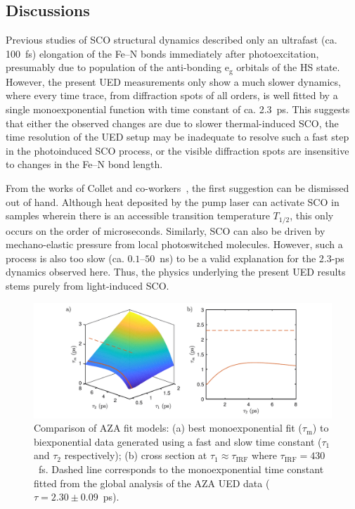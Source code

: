 \subsection{Discussions}

Previous studies of SCO structural dynamics described only
an ultrafast (ca. 100~fs) elongation of the Fe--N bonds immediately after photoexcitation,
presumably due to population of the anti-bonding $\mathrm{e_g}$ orbitals of the HS state.
%
However, the present UED measurements only show a much slower dynamics,
where every time trace, from diffraction spots of all orders,
is well fitted by a single monoexponential function with time constant of ca. 2.3~ps.
%
This suggests that either
the observed changes are due to slower thermal-induced SCO,
the time resolution of the UED setup may be inadequate
to resolve such a fast step in the photoinduced SCO process, or
the visible diffraction spots are insensitive to changes in the Fe--N bond length.

From the works of Collet and co-workers~\cite{Lorenc2012, Collet2012a, Collet2012b,
Bertoni2016a, Bertoni2016b},
the first suggestion can be dismissed out of hand.
Although heat deposited by the pump laser can activate SCO in samples
wherein there is an accessible transition temperature $T_{1/2}$,
this only occurs on the order of microseconds.
Similarly, SCO can also be driven by mechano-elastic pressure from local photoswitched molecules.
However, such a process is also too slow (ca. $0.1$--$50$~ns) to be a valid explanation
for the 2.3-ps dynamics observed here.
Thus, the physics underlying the present UED results stems purely from light-induced SCO.

\begin{figure}[ht!]
  \centering
  \includegraphics[width = \textwidth]{Figures/fig_AZA_tau12.pdf}
  \caption[Comparison of AZA fit models.]{
    Comparison of AZA fit models:
    (a) best monoexponential fit ($\tau_\text{m}$) to
    biexponential data generated using a fast and slow time constant
    ($\tau_1$ and $\tau_2$ respectively);
    (b) cross section at $\tau_1 \approx \tau_\text{IRF}$ where $\tau_\text{IRF} = 430$~fs.
    Dashed line corresponds to the monoexponential time constant fitted from
    the global analysis of the AZA UED data ($\tau = 2.30 \pm 0.09$~ps).
  }
  \label{fig: AZA-tau12}
\end{figure}

